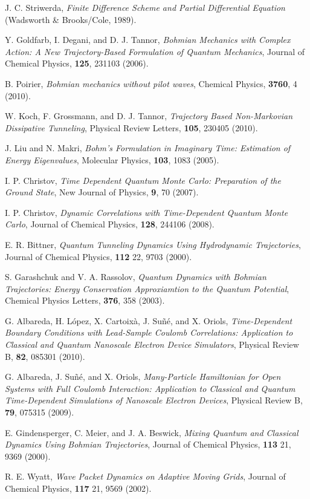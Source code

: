 \documentclass[onecolumn,nofootinbib, secnumarabic, amsmath, nobibnotes,12pt,aps,pra]{revtex4-1}
\begin{document}
\begin{thebibliography}{999}
J. C. Striwerda, \emph{Finite Difference Scheme and Partial Differential Equation} (Wadsworth \& Brooks/Cole, 1989).

Y. Goldfarb, I. Degani, and D. J. Tannor, \emph{Bohmian Mechanics with Complex Action: A New Trajectory-Based Formulation of Quantum Mechanics}, Journal of Chemical Physics, \textbf{125},  231103 (2006).

B. Poirier, \emph{Bohmian mechanics without pilot waves}, Chemical Physics, \textbf{3760}, 4 (2010).

W. Koch, F. Grossmann, and D. J. Tannor, \emph{Trajectory Based Non-Markovian Dissipative Tunneling}, Physical Review Letters, \textbf{105},  230405 (2010).

J. Liu and N. Makri, \emph{Bohm's Formulation in Imaginary Time: Estimation of Energy Eigenvalues}, Molecular Physics, \textbf{103},  1083 (2005).

I. P. Christov, \emph{Time Dependent Quantum Monte Carlo: Preparation of the Ground State}, New Journal of Physics, \textbf{9},  70 (2007).

I. P. Christov, \emph{Dynamic Correlations with Time-Dependent Quantum Monte Carlo}, Journal of Chemical Physics, \textbf{128},  244106 (2008).

E. R. Bittner, \emph{Quantum Tunneling Dynamics Using Hydrodynamic Trajectories}, Journal of Chemical Physics, \textbf{112} 22,  9703 (2000).

S. Garashchuk and V. A. Rassolov, \emph{Quantum Dynamics with Bohmian Trajectories: Energy Conservation Approxiamtion to the Quantum Potential}, Chemical Physics Letters, \textbf{376},  358 (2003).

G. Albareda, H. L\'{o}pez, X. Cartoix\`{a}, J.  Su\~{n}\'{e}, and X.
Oriols, \emph{Time-Dependent Boundary Conditions with Lead-Sample
Coulomb  Correlations: Application to Classical and Quantum
Nanoscale Electron Device Simulators}, Physical Review B,
\textbf{82},  085301 (2010).

G. Albareda, J. Su\~{n}\'{e}, and X. Oriols, \emph{Many-Particle Hamiltonian for Open Systems with Full Coulomb Interaction: Application to Classical and Quantum Time-Dependent Simulations of Nanoscale Electron Devices}, Physical Review B, \textbf{79},  075315 (2009).

E. Gindensperger, C. Meier, and J. A. Beswick, \emph{Mixing Quantum and Classical Dynamics Using Bohmian Trajectories}, Journal of Chemical Physics, \textbf{113} 21,  9369 (2000).

R. E. Wyatt, \emph{Wave Packet Dynamics on Adaptive Moving Grids}, Journal of Chemical Physics, \textbf{117} 21,  9569 (2002).

\end{thebibliography}
\end{document}
